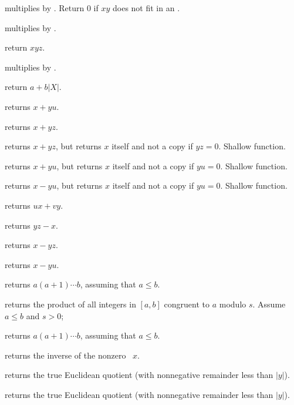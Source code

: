  multiplies  by .
Return $0$ if $xy$ does not fit in an .

 multiplies  by .

 return $xyz$.

 multiplies  by .

 return $a + b|X|$.

 returns $x +yu$.

 returns $x + yz$.

 returns $x + yz$, but
returns $x$ itself and not a copy if $yz = 0$. Shallow function.

 returns $x +yu$, but
returns $x$ itself and not a copy if $yu = 0$. Shallow function.

 returns $x- yu$, but
returns $x$ itself and not a copy if $yu = 0$. Shallow function.

 returns $ux + vy$.

 returns $yz - x$.

 returns $x - yz$.

 returns $x -yu$.

 returns $a(a+1)\cdots b$, assuming
that $a \leq b$.

 returns the product
of all integers in $[a,b]$ congruent to $a$ modulo $s$. Assume $a\leq b$ and
$s > 0$;

 returns $a(a+1)\cdots b$, assuming
that $a \leq b$.

 returns the inverse of the nonzero ~$x$.

 returns the true Euclidean quotient
(with nonnegative remainder less than $|y|$).

 returns the true Euclidean quotient
(with nonnegative remainder less than $|y|$).

